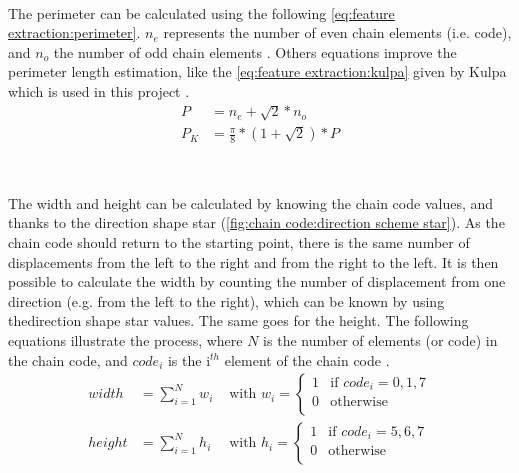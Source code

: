 ~~ 

The perimeter can be calculated using the following \vref{eq:feature extraction:perimeter}. $n_e$ represents the number of even chain elements (i.e. code), and $n_o$ the number of odd chain elements \cite{bib:chain:EstimateAreasAndPerimetersChainCode}. Others equations improve the perimeter length estimation, like the \vref{eq:feature extraction:kulpa} given by Kulpa which is used in this project \cite{bib:chain:ObjectDescription}.
\begin{align} 
P &= n_e + \sqrt{2}*n_o \label{eq:feature extraction:perimeter} \\
P_K &= \frac{\pi}{8} * (1 + \sqrt{2}) * P \label{eq:feature extraction:kulpa}
\end{align}


~~

The width and height can be calculated by knowing the chain code values, and thanks to the direction shape star (\vref{fig:chain code:direction scheme star}). As the chain code should return to the starting point, there is the same number of displacements from the left to the right and from the right to the left. It is then possible to calculate the width by counting the number of displacement from one direction (e.g. from the left to the right), which can be known by using thedirection shape star values. The same goes for the height. The following equations illustrate the process, where $N$ is the number of elements (or code) in the chain code, and $code_i$ is the i$^{th}$ element of the chain code \cite{bib:chain:ShapeDescription}.
\begin{align}
width &= \sum_{i = 1}^{N} w_i 
& \text{ with } w_i = 
	\begin{cases}
		1 & \text{if } code_i = 0, 1, 7 \\
		0 & \text{otherwise} \\
	\end{cases} \\
height &= \sum_{i = 1}^{N} h_i 
& \text{ with }  h_i = 
	\begin{cases}
		1 & \text{if } code_i = 5, 6, 7 \\
		0 & \text{otherwise} \\
	\end{cases} 
\end{align}


